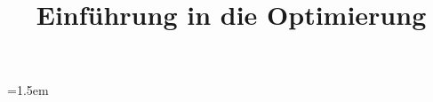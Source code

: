 \documentclass{mycourse}
\title{Einführung in die Optimierung}
\theoremstyle{mythm} 								%
\begin{document}
\emergencystretch=1.5em

\maketitle

\tableofcontents




\end{document}
